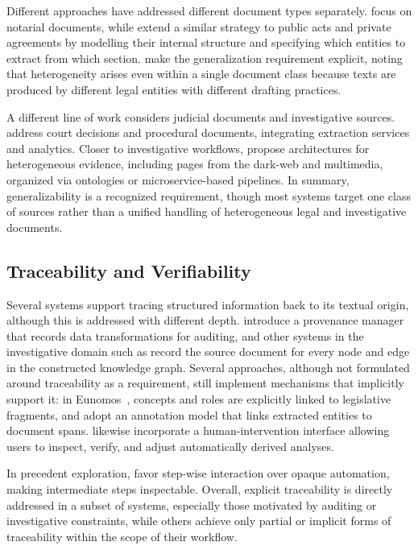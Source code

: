 Different approaches have addressed different document types separately. \textcite{amato2008} focus on notarial documents, while \textcite{buey2016} extend a similar strategy to public acts and private agreements by modelling their internal structure and specifying which entities to extract from which section. \textcite{breit_legal_permits_2020} make the generalization requirement explicit, noting that heterogeneity arises even within a single document class because texts are produced by different legal entities with different drafting practices.


A different line of work considers judicial documents and investigative sources. \textcite{bellandi2025streamlining} address court decisions and procedural documents, integrating extraction services and analytics. Closer to investigative workflows, \textcite{szekely2015building,kejriwal2017searchengine,kejriwal2018,P_rez_2021} propose architectures for heterogeneous evidence, including pages from the dark-web and multimedia, organized via ontologies or microservice-based pipelines. In summary, generalizability is a recognized requirement, though most systems target one class of sources rather than a unified handling of heterogeneous legal and investigative documents.

\subsection{Traceability and Verifiability}

Several systems support tracing structured information back to its textual origin, although this is addressed with different depth. \textcite{breit_legal_permits_2020} introduce a provenance manager that records data transformations for auditing, and other systems in the investigative domain such as \textcite{szekely2015building,kejriwal2017searchengine} record the source document for every node and edge in the constructed knowledge graph. Several approaches, although not formulated around traceability as a requirement, still implement mechanisms that implicitly support it: in Eunomos~\cite{boella2016eunomos,boella2019semi}, concepts and roles are explicitly linked to legislative fragments, and \textcite{bellandi2025streamlining} adopt an annotation model that links extracted entities to document spans. \textcite{HAN2024121052legalasst} likewise incorporate a human-intervention interface allowing users to inspect, verify, and adjust automatically derived analyses.

In precedent exploration, \textcite{human-ai-system-legal-precedent-search-china} favor step-wise interaction over opaque automation, making intermediate steps inspectable. Overall, explicit traceability is directly addressed in a subset of systems, especially those motivated by auditing or investigative constraints, while others achieve only partial or implicit forms of traceability within the scope of their workflow.



